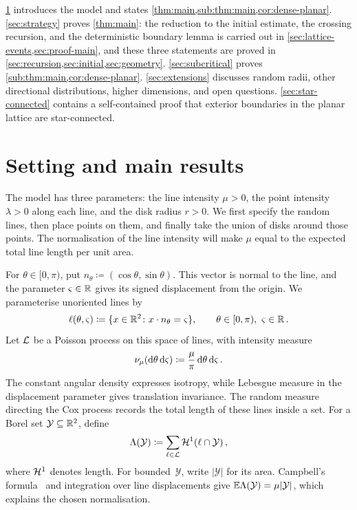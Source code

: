 \documentclass[11pt,letterpaper]{article}
\begin{document}
\cref{sec:setting} introduces the model and states \cref{thm:main,sub:thm:main,cor:dense-planar}. \cref{sec:strategy} proves \cref{thm:main}: the reduction to the initial estimate, the crossing recursion, and the deterministic boundary lemma is carried out in \cref{sec:lattice-events,sec:proof-main}, and these three statements are proved in \cref{sec:recursion,sec:initial,sec:geometry}. \cref{sec:subcritical} proves \cref{sub:thm:main,cor:dense-planar}. \cref{sec:extensions} discusses random radii, other directional distributions, higher dimensions, and open questions. \cref{sec:star-connected} contains a self-contained proof that exterior boundaries in the planar lattice are star-connected.

\section{Setting and main results}
\label{sec:setting}

The model has three parameters: the line intensity $\mu>0$, the point intensity $\lambda>0$ along each line, and the disk radius $r>0$. We first specify the random lines, then place points on them, and finally take the union of disks around those points. The normalisation of the line intensity will make $\mu$ equal to the expected total line length per unit area.

For $\theta\in[0,\pi)$, put $n_\theta\coloneqq(\cos\theta,\sin\theta)$. This vector is normal to the line, and the parameter $\varsigma\in\mathbb R$ gives its signed displacement from the origin. We parameterise unoriented lines by
\begin{equation}\label{eq:line-parameters}
  \ell(\theta,\varsigma)\coloneqq\{x\in\mathbb R^2\colon x\cdot n_\theta=\varsigma\},\qquad\theta\in[0,\pi),\ \varsigma\in\mathbb R\,.
\end{equation}
Let $\mathcal L$ be a Poisson process on this space of lines, with intensity measure
\begin{equation}\label{eq:line-intensity}
  \nu_\mu(\mathrm{d}\theta\,\mathrm{d} \varsigma)\coloneqq\frac\mu\pi\,\mathrm{d}\theta\,\mathrm{d} \varsigma\,.
\end{equation}
The constant angular density expresses isotropy, while Lebesgue measure in the displacement parameter gives translation invariance. The random measure directing the Cox process records the total length of these lines inside a set. For a Borel set $\mathcal Y\subseteq\mathbb R^2$, define
\begin{equation}\label{eq:directing-measure}
  \Lambda(\mathcal Y)\coloneqq\sum_{\ell\in\mathcal L}\mathcal H^1(\ell\cap \mathcal Y)\,,
\end{equation}
where $\mathcal H^1$ denotes length. For bounded~$\mathcal Y$, write $\lvert \mathcal Y\rvert$ for its area. Campbell's formula~\cite[Proposition~2.7]{LP17} and integration over line displacements give $\mathbb E\Lambda(\mathcal Y)=\mu\lvert \mathcal Y\rvert$, which explains the chosen normalisation.
\end{document}
